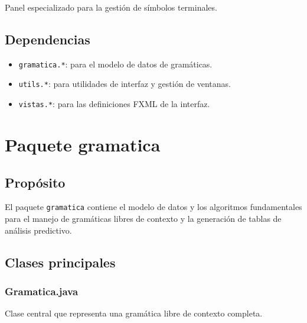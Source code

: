 Panel especializado para la gestión de símbolos terminales.

\subsection{Dependencias}

\begin{itemize}
    \item \texttt{gramatica.*}: para el modelo de datos de gramáticas.
    \item \texttt{utils.*}: para utilidades de interfaz y gestión de ventanas.
    \item \texttt{vistas.*}: para las definiciones FXML de la interfaz.
\end{itemize}

\section{Paquete gramatica}

\subsection{Propósito}

El paquete \texttt{gramatica} contiene el modelo de datos y los algoritmos fundamentales para el manejo de gramáticas libres de contexto y la generación de tablas de análisis predictivo.

\subsection{Clases principales}

\subsubsection{Gramatica.java}

Clase central que representa una gramática libre de contexto completa.

